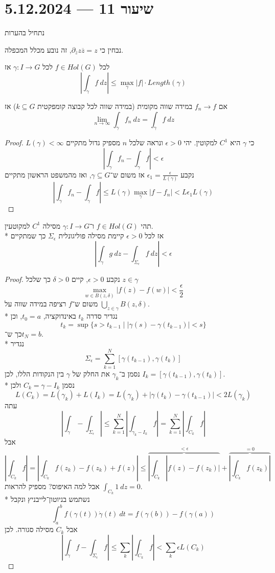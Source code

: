 \section{שיעור 11 --- 5.12.2024}
נתחיל בהערות
\begin{remark}
	נבחין כי $\partial_{\overline{z}} z \overline{z} = z$, זה נובע מכלל המכפלה.
\end{remark}
\begin{theorem}
	לכל $f \in Hol(G)$ לכל $\gamma : I \to G$ אז
	\[
	|\int_\gamma f\ dz| \le \max_\gamma |f| \cdot Length(\gamma)
	\]
\end{theorem}
\begin{theorem}
	אם $f_n \to f$ במידה שווה מקומית (במידה שווה לכל קבוצה קומפקטית $k \subseteq G$) אז
	\[
		\lim_{n \to \infty} \int_\gamma f_n\ dz = \int_\gamma f\ dz
	\]
\end{theorem}
\begin{proof}
	$L(\gamma) < \infty$ כי $\gamma$ היא $C^1$ למקוטין.
	יהי $\epsilon > 0$ ונראה שלכל $n$ מספיק גדול מתקיים
	\[
		| \int_\gamma f_n - \int_\gamma f| < \epsilon
	\]
	נקבע $\epsilon_1 = \frac{\epsilon}{L(\gamma)}$ אז משום ש־$\gamma \subseteq G$,
	ואז מהמשפט הראשון מתקיים
	\[
		|\int_\gamma f_n - \int_\gamma f| \le L(\gamma) \max_\gamma |f - f_n| < L \epsilon_1 L(\gamma)
	\]
\end{proof}
\begin{theorem}
	תהי $f \in Hol(G)$ ו־$\gamma : I \to G$ מסילה $C^1$ למקוטעין. \\*
	אז לכל $\epsilon > 0$ קיימת מסילה פוליגונלית $\Sigma_\epsilon$ כך שמתקיים
	\[
		|\int_\gamma g\ dz - \int_{\Sigma_\epsilon} f\ dz| < \epsilon
	\]
\end{theorem}
\begin{proof}
	נקבע $\epsilon > 0$, קיים $\delta > 0$ כך שלכל $z \in \gamma$
	\[
		\max_{w \in B(z, \delta)} |f(z) - f(w)| < \frac{\epsilon}{2}
	\]
	משום ש־$f$ רציפה במידה שווה על $\bigcup_{z \in \gamma} B(z, \delta)$. \\*
	נגדיר סדרה $t_k$ באינדוקציה, $t_0 = a$, וכן
	\[
		t_k = \sup\{s > t_{k - 1} \mid |\gamma(s) - \gamma(t_{k - 1})| < s\}
	\]
	כך ש־$t_N = b$. \\*
	נגדיר
	\[
		\Sigma_\epsilon = \sum_{k = 1}^{N} [\gamma(t_{k - 1}), \gamma(t_k)]
	\]
	נסמן ב־$\gamma_k$ את החלק של $\gamma$ בין הנקודות הללו, לכן $I_k = [\gamma(t_{k - 1}), \gamma(t_k)]$. \\*
	נסמן $C_k = \gamma - I_k$ ולכן
	\[
		L(C_k)
		= L(\gamma_k) + L(I_k)
		= L(\gamma_k) + |\gamma(t_k) - \gamma(t_{k - 1})|
		< 2 L(\gamma_k)
	\]
	עתה
	\[
		|\int_\gamma - \int_{\Sigma_\epsilon}| \le \sum_{k = 1}^{N} |\int_{\gamma_k - I_k} f|
		= \sum_{k = 1}^{N} |\int_{C_k} f|
	\]
	אבל
	\[
		|\int_{C_k} f|
		= |\int_{C_k} f(z_k) - f(z_k) + f(z)|
		\le \overbrace{|\int_{C_k} |f(z) - f(z_k)|}^{< \epsilon} + \overbrace{|\int_{C_k} f(z_k)|}^{= 0}
	\]
	אבל למה האיפוס? מספיק להראות $\int_{C_k} 1\ dz = 0$. \\*
	נשתמש בניוטון־לייבניץ ונקבל
	\[
		\int_a^b f(\gamma(t)) \dot{\gamma}(t)\ dt = f(\gamma(b)) - f(\gamma(a))
	\]
	אבל $C_k$ מסילה סגורה.
	לכן
	\[
		|\int_\gamma f - \int_{\Sigma_\epsilon} f|
		\le \sum_k |\int_{C_k} f|
		< \sum_k \epsilon L(C_k)
	\]
\end{proof}

